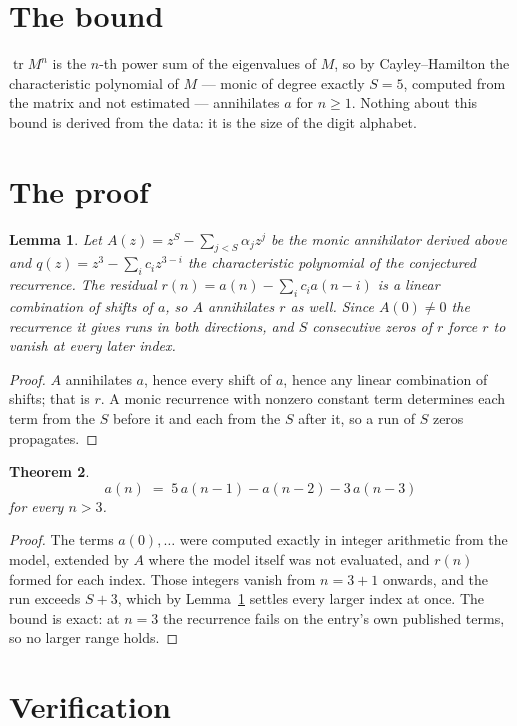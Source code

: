\documentclass[11pt,a4paper]{article}
\theoremstyle{plain}
\newtheorem{theorem}{Theorem}
\newtheorem{lemma}[theorem]{Lemma}
\theoremstyle{definition}
\begin{document}
\section{The bound}

$\operatorname{tr}M^{n}$ is the $n$-th power sum of the eigenvalues of $M$, so by
Cayley--Hamilton the characteristic polynomial of $M$ --- monic of degree exactly $S=5$,
computed from the matrix and not estimated --- annihilates $a$ for $n\ge1$. Nothing about this
bound is derived from the data: it is the size of the digit alphabet.

\section{The proof}

\begin{lemma}\label{lem:crit}
Let $A(z)=z^S-\sum_{j<S}\alpha_jz^{j}$ be the monic annihilator derived above and
$q(z)=z^{3}-\sum_ic_iz^{3-i}$ the characteristic polynomial of the conjectured
recurrence. The residual $r(n)=a(n)-\sum_ic_ia(n-i)$ is a linear combination of shifts of $a$,
so $A$ annihilates $r$ as well. Since $A(0)\ne0$ the recurrence it gives runs in both
directions, and $S$ consecutive zeros of $r$ force $r$ to vanish at every later index.
\end{lemma}

\begin{proof}
$A$ annihilates $a$, hence every shift of $a$, hence any linear combination of shifts; that is
$r$. A monic recurrence with nonzero constant term determines each term from the $S$ before it
and each from the $S$ after it, so a run of $S$ zeros propagates.
\end{proof}

\begin{theorem}
\[
a(n)\;=\;5\,a(n-1) - a(n-2) - 3\,a(n-3)
\]
for every $n>3$.
\end{theorem}

\begin{proof}
The terms $a(0),\dots$ were computed exactly in integer arithmetic from the model, extended by
$A$ where the model itself was not evaluated, and $r(n)$ formed for each index. Those integers
vanish from $n=3+1$ onwards, and the run exceeds $S+3$, which by
Lemma~\ref{lem:crit} settles every larger index at once. The bound is exact: at $n=3$ the recurrence fails on the entry's own published terms, so no larger range holds.
\end{proof}

\section{Verification}
\end{document}
